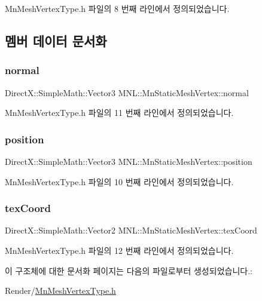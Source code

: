 Mn\+Mesh\+Vertex\+Type.\+h 파일의 8 번째 라인에서 정의되었습니다.



\subsection{멤버 데이터 문서화}
\mbox{\label{struct_m_n_l_1_1_mn_static_mesh_vertex_a84c6cf3477bd4e1e75c674abfd8e2d12}} 
\subsubsection{\texorpdfstring{normal}{normal}}
{\footnotesize\ttfamily Direct\+X\+::\+Simple\+Math\+::\+Vector3 M\+N\+L\+::\+Mn\+Static\+Mesh\+Vertex\+::normal}



Mn\+Mesh\+Vertex\+Type.\+h 파일의 11 번째 라인에서 정의되었습니다.

\mbox{\label{struct_m_n_l_1_1_mn_static_mesh_vertex_a45ad1d04c12d6742f1523476a134ecfb}} 
\subsubsection{\texorpdfstring{position}{position}}
{\footnotesize\ttfamily Direct\+X\+::\+Simple\+Math\+::\+Vector3 M\+N\+L\+::\+Mn\+Static\+Mesh\+Vertex\+::position}



Mn\+Mesh\+Vertex\+Type.\+h 파일의 10 번째 라인에서 정의되었습니다.

\mbox{\label{struct_m_n_l_1_1_mn_static_mesh_vertex_a75e7dc7e267a5bad4ee03a662aa57769}} 
\subsubsection{\texorpdfstring{tex\+Coord}{texCoord}}
{\footnotesize\ttfamily Direct\+X\+::\+Simple\+Math\+::\+Vector2 M\+N\+L\+::\+Mn\+Static\+Mesh\+Vertex\+::tex\+Coord}



Mn\+Mesh\+Vertex\+Type.\+h 파일의 12 번째 라인에서 정의되었습니다.



이 구조체에 대한 문서화 페이지는 다음의 파일로부터 생성되었습니다.\+:\begin{DoxyCompactItemize}
\item 
Render/\hyperlink{_mn_mesh_vertex_type_8h}{Mn\+Mesh\+Vertex\+Type.\+h}\end{DoxyCompactItemize}
